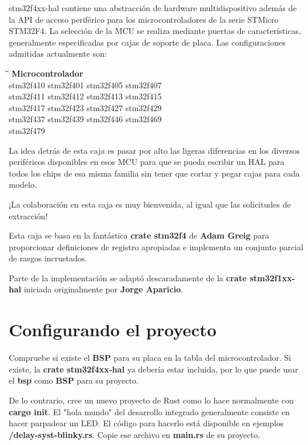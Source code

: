 stm32f4xx-hal contiene una abstracción de hardware multidispositivo además de la API de acceso periférico para los microcontroladores de la serie STMicro STM32F4. La selección de la MCU se realiza mediante puertas de características, generalmente especificadas por cajas de soporte de placa. Las configuraciones admitidas actualmente son:
\begin{tabbing}
	\hspace{120pt}\=\hspace{120pt}\=\hspace{120pt}\=\kill
		\> \textbf{Microcontrolador} \>  \>  \\
	stm32f410 \> stm32f401 \>  stm32f405\> stm32f407\\ 
	stm32f411 \> stm32f412 \> stm32f413 \> stm32f415\\ 
	stm32f417 \> stm32f423 \> stm32f427 \> stm32f429\\ 
	stm32f437 \> stm32f439 \> stm32f446 \> stm32f469\\ 
	stm32f479 \>  \>  \> 
\end{tabbing} 


La idea detrás de esta caja es pasar por alto las ligeras diferencias en los diversos periféricos disponibles en esos MCU para que se pueda escribir un HAL para todos los chips de esa misma familia sin tener que cortar y pegar cajas para cada modelo.

¡La colaboración en esta caja es muy bienvenida, al igual que las solicitudes de extracción!

Esta caja se basa en la fantástica \textbf{crate stm32f4} de \textbf{Adam Greig} para proporcionar definiciones de registro apropiadas e implementa un conjunto parcial de rasgos incrustados.

Parte de la implementación se adaptó descaradamente de la \textbf{crate stm32f1xx-hal} iniciada originalmente por \textbf{Jorge Aparicio}.


\section{Configurando el proyecto}

Compruebe si existe el \textbf{BSP} para su placa en la tabla del microcontrolador. Si existe, la \textbf{crate stm32f4xx-hal} ya debería estar incluida, por lo que puede usar el \textbf{bsp} como \textbf{BSP} para su proyecto.

De lo contrario, cree un nuevo proyecto de Rust como lo hace normalmente con \textbf{cargo init}. El "hola mundo" del desarrollo integrado generalmente consiste en hacer parpadear un LED. El código para hacerlo está disponible en ejemplos \textbf{/delay-syst-blinky.rs}. Copie ese archivo en \textbf{main.rs} de su proyecto.

